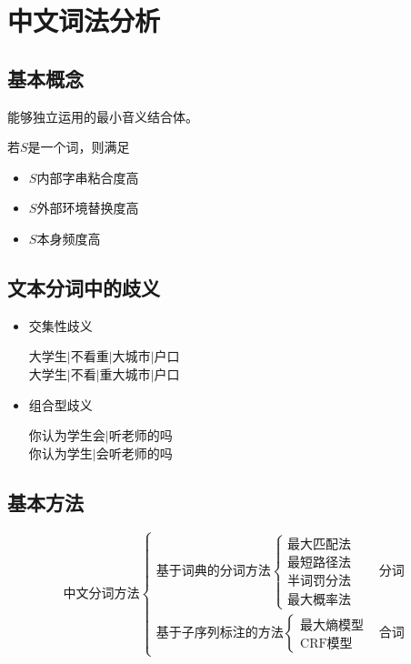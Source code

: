 
\section{中文词法分析}
\subsection{基本概念}
\begin{definition}[词]
能够独立运用的最小音义结合体。
\end{definition}

若$S$是一个词，则满足
\begin{itemize}
\item $S$内部字串粘合度高
\item $S$外部环境替换度高
\item $S$本身频度高
\end{itemize}

\subsection{文本分词中的歧义}
\begin{itemize}
	\item 交集性歧义
\begin{displayquote}
大学生$\mid$不看重$\mid$大城市$\mid$户口\\
大学生$\mid$不看$\mid$重大城市$\mid$户口\\
\end{displayquote}
	\item 组合型歧义
\begin{displayquote}
你认为学生会$\mid$听老师的吗\\
你认为学生$\mid$会听老师的吗\\
\end{displayquote}
\end{itemize}

\subsection{基本方法}
\[\text{中文分词方法}\begin{cases}
\text{基于词典的分词方法}\begin{cases}
\text{最大匹配法}\\
\text{最短路径法}\\
\text{半词罚分法}\\
\text{最大概率法}
\end{cases} & \text{分词}\\
\text{基于子序列标注的方法}\begin{cases}
\text{最大熵模型}\\
\text{CRF模型}
\end{cases} & \text{合词}
\end{cases}\]

